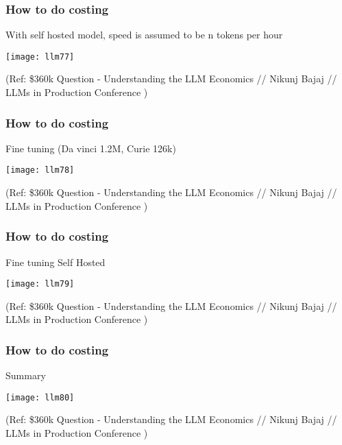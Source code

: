 \begin{frame}[fragile]\frametitle{How to do costing}

With self hosted model, speed is assumed to be n tokens per hour

\begin{center}
\texttt{[image: llm77]}
\end{center}		



{\tiny (Ref: \$360k Question - Understanding the LLM Economics // Nikunj Bajaj // LLMs in Production Conference )}

\end{frame}

\begin{frame}[fragile]\frametitle{How to do costing}

Fine tuning (Da vinci 1.2M, Curie 126k)
\begin{center}
\texttt{[image: llm78]}
\end{center}		



{\tiny (Ref: \$360k Question - Understanding the LLM Economics // Nikunj Bajaj // LLMs in Production Conference )}

\end{frame}

\begin{frame}[fragile]\frametitle{How to do costing}

Fine tuning Self Hosted
\begin{center}
\texttt{[image: llm79]}
\end{center}		



{\tiny (Ref: \$360k Question - Understanding the LLM Economics // Nikunj Bajaj // LLMs in Production Conference )}

\end{frame}

\begin{frame}[fragile]\frametitle{How to do costing}

Summary 

\begin{center}
\texttt{[image: llm80]}
\end{center}		



{\tiny (Ref: \$360k Question - Understanding the LLM Economics // Nikunj Bajaj // LLMs in Production Conference )}

\end{frame}


